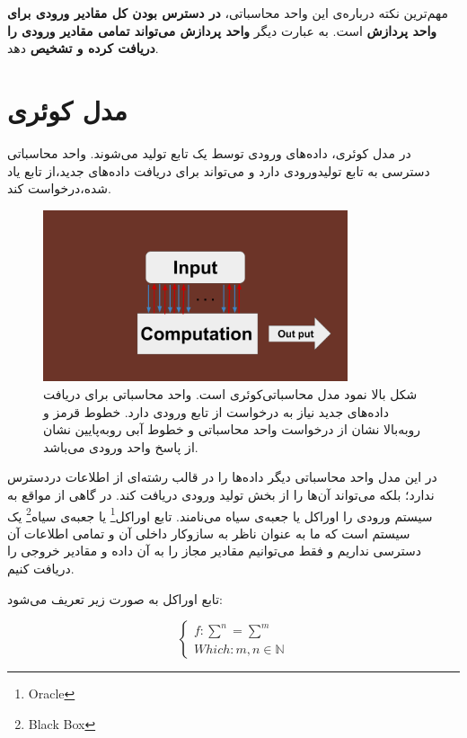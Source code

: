 \documentclass{book}
\begin{document}
مهم‌ترین نکته درباره‌ی این واحد محاسباتی،‌ \textbf{در دسترس بودن کل مقادیر ورودی برای واحد پردازش} است. به عبارت دیگر\textbf{ واحد پردازش می‌تواند تمامی مقادیر ورودی را دریافت کرده و تشخیص} دهد. 

\section{مدل کوئری}
در مدل کوئری، داده‌های ورودی توسط یک تابع تولید می‌شوند. واحد محاسباتی دسترسی به تابع تولیدورودی دارد و می‌تواند برای دریافت داده‌های جدید،‌از تابع یاد شده،‌درخواست کند.

\begin{figure}[ht]
	\centering
	\includegraphics[width=0.8\textwidth]{Query computation model.png}
	\caption{شکل بالا نمود مدل محاسباتی‌کوئری است. واحد محاسباتی برای دریافت داده‌های جدید نیاز به درخواست از تابع ورودی دارد. خطوط قرمز و روبه‌بالا نشان از درخواست واحد محاسباتی و خطوط آبی روبه‌پایین نشان از پاسخ واحد ورودی می‌باشد.}
\end{figure}


در این مدل واحد محاسباتی دیگر داده‌ها را در قالب رشته‌ای از اطلاعات دردسترس ندارد؛ بلکه می‌تواند آن‌ها را از بخش تولید ورودی دریافت کند. در گاهی از مواقع به سیستم ورودی را اوراکل یا جعبه‌ی سیاه می‌نامند. تابع اوراکل\footnote{Oracle} یا جعبه‌ی سیاه\footnote{Black Box} یک سیستم است که ما به عنوان ناظر به سازوکار داخلی آن و  تمامی اطلاعات آن دسترسی نداریم و فقط می‌توانیم مقادیر مجاز را به آن داده و مقادیر خروجی را دریافت کنیم. 

تابع اوراکل به صورت زیر تعریف می‌شود:
\begin{center}
	\begin{equation}\label{key}
		\left\{
		\begin{array}{ll}
			f : \sum^n = \sum^m\\
			Which : m, n \in \mathbb{N}
		\end{array}
		\right.
	\end{equation}
\end{center}
\end{document}
